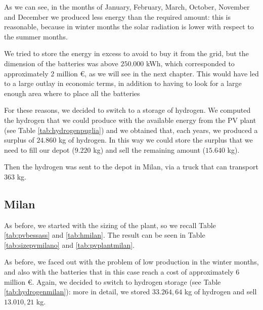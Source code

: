 

As we can see, in the months of January, February, March, October, November and December we produced less energy than the required amount: this is reasonable, because in winter months the solar radiation is lower with respect to the summer months.

We tried to store the energy in excess to avoid to buy it from the grid, but the dimension of the batteries was above $250.000$ kWh, which corresponded to approximately 2 million €, as we will see in the next chapter. This would have led to a large outlay in economic terms, in addition to having to look for a large enough area where to place all the batteries

For these reasons, we decided to switch to a storage of hydrogen. We computed the hydrogen that we could produce with the available energy from the PV plant (see Table \ref{tab:hydrogenpuglia}) and we obtained that, each years, we produced a surplus of $24.860$ kg of hydrogen. In this way we could store the surplus that we need to fill our depot ($9.220$ kg) and sell the remaining amount ($15.640$ kg).

Then the hydrogen was sent to the depot in Milan, via a truck that can transport $363$ kg.



\subsection{Milan}
As before, we started with the sizing of the plant, so we recall Table \ref{tab:pvbessass} and \ref{tab:hmilan}. The result can be seen in Table \ref{tab:sizepvmilano} and \ref{tab:pvplantmilan}.





As before, we faced out with the problem of low production in the winter months, and also with the batteries that in this case reach a cost of approximately 6 million €. Again, we decided to switch to hydrogen storage (see Table \ref{tab:hydrogenmilan}): more in detail, we stored $33.264,64$ kg of hydrogen and sell $13.010,21$ kg.

